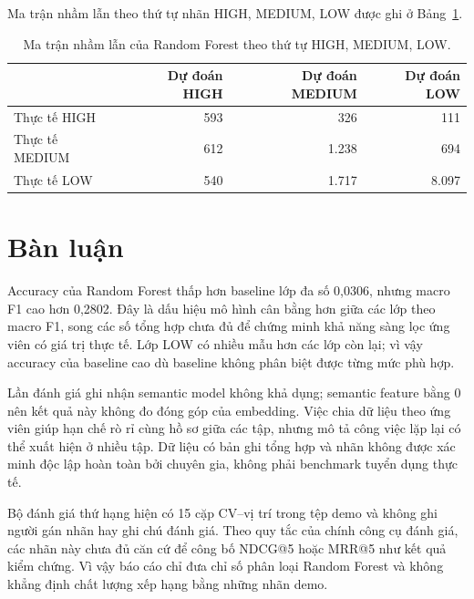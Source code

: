 Ma trận nhầm lẫn theo thứ tự nhãn HIGH, MEDIUM, LOW được ghi ở Bảng~\ref{tab:confusion}.
\begin{table}[H]
\centering
\caption{Ma trận nhầm lẫn của Random Forest theo thứ tự HIGH, MEDIUM, LOW.}
\label{tab:confusion}
\begin{tabular}{lrrr}
\toprule
 & \textbf{Dự đoán HIGH} & \textbf{Dự đoán MEDIUM} & \textbf{Dự đoán LOW} \\
\midrule
Thực tế HIGH & 593 & 326 & 111 \\
Thực tế MEDIUM & 612 & 1.238 & 694 \\
Thực tế LOW & 540 & 1.717 & 8.097 \\
\bottomrule
\end{tabular}
\end{table}

\section{Bàn luận}
Accuracy của Random Forest thấp hơn baseline lớp đa số 0,0306, nhưng macro F1 cao hơn 0,2802. Đây là dấu hiệu mô hình cân bằng hơn giữa các lớp theo macro F1, song các số tổng hợp chưa đủ để chứng minh khả năng sàng lọc ứng viên có giá trị thực tế. Lớp LOW có nhiều mẫu hơn các lớp còn lại; vì vậy accuracy của baseline cao dù baseline không phân biệt được từng mức phù hợp.

Lần đánh giá ghi nhận semantic model không khả dụng; semantic feature bằng 0 nên kết quả này không đo đóng góp của embedding. Việc chia dữ liệu theo ứng viên giúp hạn chế rò rỉ cùng hồ sơ giữa các tập, nhưng mô tả công việc lặp lại có thể xuất hiện ở nhiều tập. Dữ liệu có bản ghi tổng hợp và nhãn không được xác minh độc lập hoàn toàn bởi chuyên gia, không phải benchmark tuyển dụng thực tế.

Bộ đánh giá thứ hạng hiện có 15 cặp CV–vị trí trong tệp demo và không ghi người gán nhãn hay ghi chú đánh giá. Theo quy tắc của chính công cụ đánh giá, các nhãn này chưa đủ căn cứ để công bố NDCG@5 hoặc MRR@5 như kết quả kiểm chứng. Vì vậy báo cáo chỉ đưa chỉ số phân loại Random Forest và không khẳng định chất lượng xếp hạng bằng những nhãn demo.


